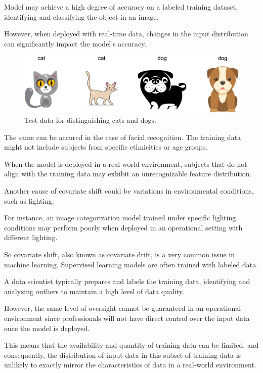 Model may achieve a high degree of accuracy on a labeled training dataset, identifying and classifying the object in an image. 

However, when deployed with real-time data, changes in the input distribution can significantly impact the model's accuracy.
		
	\vspace{1cm}
	\begin{figure}[H]
		\centering
		\includegraphics[width=1\textwidth]{assets/cat-dog-test.png} 
		\caption{Test data for distinguishing cats and dogs.}
		\label{fig:cani-gatti-ts}
	\end{figure}
	\vspace{1cm}
	
The same can be accured in the case of facial recognition. The training data might not include subjects from specific ethnicities or age groups.

When the model is deployed in a real-world environment, subjects that do not align with the training data may exhibit an unrecognizable feature distribution. 

Another cause of covariate shift could be variations in environmental conditions, such as lighting.

For instance, an image categorization model trained under specific lighting conditions may perform poorly when deployed in an operational setting with different lighting.
	
	\vspace{0.5cm}
	
So covariate shift, also known as covariate drift, is a very common issue in machine learning. Supervised learning models are often trained with labeled data. 

A data scientist typically prepares and labels the training data, identifying and analyzing outliers to maintain a high level of data quality.

However, the same level of oversight cannot be guaranteed in an operational environment since professionals will not have direct control over the input data once the model is deployed.

This means that the availability and quantity of training data can be limited, and consequently, the distribution of input data in this subset of training data is unlikely to exactly mirror the characteristics of data in a real-world environment.

